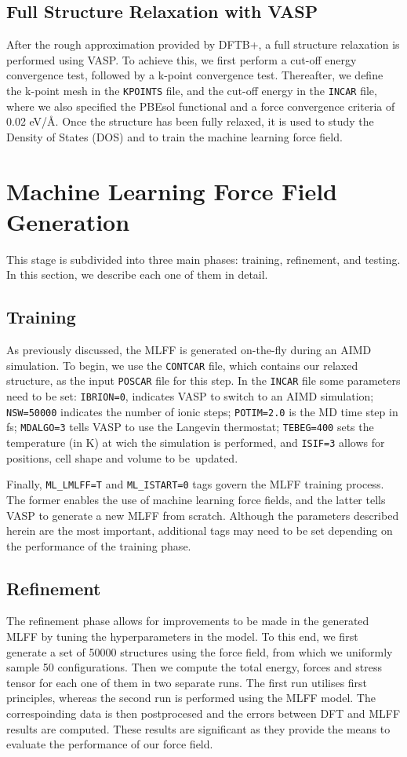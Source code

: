 \subsection{Full Structure Relaxation with VASP}
After the rough approximation provided by DFTB+, a full structure relaxation is performed using VASP. To achieve this, we first perform a cut-off energy convergence test, followed by a k-point convergence test. Thereafter, we define the k-point mesh in the \texttt{KPOINTS} file, and the cut-off energy in the \texttt{INCAR} file, where we also specified the PBEsol functional and a force convergence criteria of 0.02 eV/\AA. Once the structure has been fully relaxed, it is used to study the Density of States (DOS) and to train the machine learning force field.

\section{Machine Learning Force Field Generation}
\label{sec:mlff-generation}
This stage is subdivided into three main phases: training, refinement, and testing. In this section, we describe each one of them in detail.
\subsection{Training}
As previously discussed, the MLFF is generated on-the-fly during an AIMD simulation. To begin, we use the \texttt{CONTCAR} file, which contains our relaxed structure, as the input \texttt{POSCAR} file for this step. In the \texttt{INCAR} file some parameters need to be set: \texttt{IBRION=0}, indicates VASP to switch to an AIMD simulation; \texttt{NSW=50000} indicates the number of ionic steps; \texttt{POTIM=2.0} is the MD time step in fs; \texttt{MDALGO=3} tells VASP to use the Langevin thermostat; \texttt{TEBEG=400} sets the temperature (in K) at wich the simulation is performed, and \texttt{ISIF=3} allows for positions, cell shape and volume to be~updated. 

Finally, \texttt{ML\_LMLFF=T} and \texttt{ML\_ISTART=0} tags govern the MLFF training process. The former enables the use of machine learning force fields, and the latter tells VASP to generate a new MLFF from scratch. Although the parameters described herein are the most important, additional tags may need to be set depending on the performance of the training phase.

\subsection{Refinement}
The refinement phase allows for improvements to be made in the generated MLFF by tuning the hyperparameters in the model. To this end, we first generate a set of 50000 structures using the force field, from which we uniformly sample 50 configurations. Then we compute the total energy, forces and stress tensor for each one of them in two separate runs. The first run utilises first principles, whereas the second run is performed using the MLFF model. The correspoinding data is then postprocesed and the errors between DFT and MLFF results are computed. These results are significant as they provide the means to evaluate the performance of our force field. 

